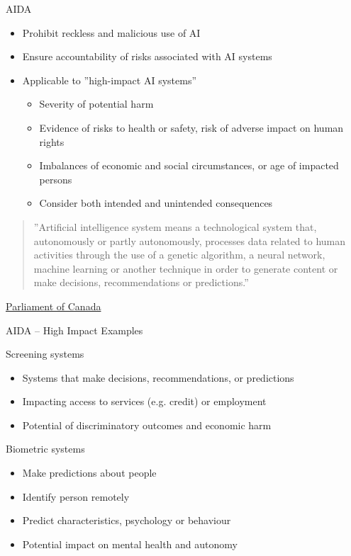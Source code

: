 \documentclass[ignorenonframetext,xcolor=x11names]{beamer}
\begin{document}
\begin{frame}[label=advanced]{AIDA}
  \begin{itemize}
     \item Prohibit reckless and malicious use of AI
     \item Ensure accountability of risks associated with AI systems
     \item Applicable to ''high-impact AI systems''
     \begin{itemize} 
        \item Severity of potential harm
        \item Evidence of risks to health or safety, risk of adverse impact on human rights
        \item Imbalances of economic and social circumstances, or age of impacted persons
        \item Consider both intended and unintended consequences
     \end{itemize}
  \end{itemize}
  
\vspace{\baselineskip}
  \begin{quote}''Artificial intelligence system means a technological system that, autonomously or partly autonomously, processes data related to human activities through the use of a genetic algorithm, a neural network, machine learning or another technique in order to generate content or make decisions, recommendations or predictions.''\end{quote} \scriptsize \href{https://www.parl.ca/legisinfo/en/bill/44-1/c-27}{Parliament of Canada}

\end{frame}

\begin{frame}[label=advanced]{AIDA -- High Impact Examples}
  \begin{block}{Screening systems}
  \begin{itemize}
     \item Systems that make decisions, recommendations, or predictions
     \item Impacting access to services (e.g. credit) or employment
     \item Potential of discriminatory outcomes and economic harm
  \end{itemize}
  \end{block}
  
  \begin{block}{Biometric systems}
  \begin{itemize}
     \item Make predictions about people
     \item Identify person remotely
     \item Predict characteristics, psychology or behaviour
     \item Potential impact on mental health and autonomy
  \end{itemize}
  \end{block}
\end{frame}
\end{document}

